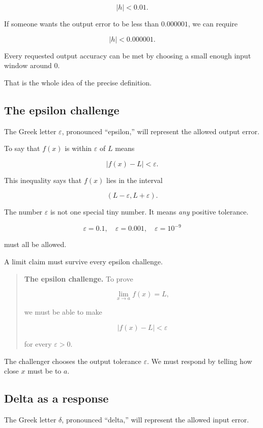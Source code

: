 \[
|h|<0.01.
\]

If someone wants the output error to be less than \(0.000001\), we can require

\[
|h|<0.000001.
\]

Every requested output accuracy can be met by choosing a small enough input window around \(0\).

That is the whole idea of the precise definition.

\subsection{The epsilon challenge}
\label{subsec:epsilon-challenge}

The Greek letter \(\varepsilon\), pronounced ``epsilon,'' will represent the allowed output error.

To say that \(f(x)\) is within \(\varepsilon\) of \(L\) means

\[
|f(x)-L|<\varepsilon.
\]

This inequality says that \(f(x)\) lies in the interval

\[
(L-\varepsilon,L+\varepsilon).
\]

The number \(\varepsilon\) is not one special tiny number.  It means \emph{any} positive tolerance.

\[
\varepsilon=0.1,\quad
\varepsilon=0.001,\quad
\varepsilon=10^{-9}
\]

must all be allowed.

A limit claim must survive every epsilon challenge.

\begin{quote}
\textbf{The epsilon challenge.}
To prove

\[
\lim_{x\to a}f(x)=L,
\]

we must be able to make

\[
|f(x)-L|<\varepsilon
\]

for every \(\varepsilon>0\).
\end{quote}

The challenger chooses the output tolerance \(\varepsilon\).  We must respond by telling how close \(x\) must be to \(a\).

\subsection{Delta as a response}
\label{subsec:delta-response}

The Greek letter \(\delta\), pronounced ``delta,'' will represent the allowed input error.

